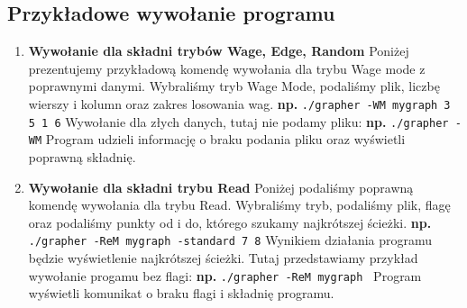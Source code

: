 \documentclass[10pt, a4paper]{report}
\begin{document}
\subsection{Przykładowe wywołanie programu}
\begin{enumerate}
    \item \textbf{Wywołanie dla składni trybów Wage, Edge, Random}
    \newline Poniżej prezentujemy przykładową komendę wywołania dla trybu Wage mode z poprawnymi danymi. Wybraliśmy tryb Wage Mode, podaliśmy plik, liczbę wierszy i kolumn oraz zakres losowania wag.
    \newline\newline \textbf{np.}
    \newline \texttt{./grapher -WM mygraph 3 5 1 6}
    \newline\newline Wywołanie dla złych danych, tutaj nie podamy pliku:
    \newline\newline \textbf{np.}
    \newline \texttt{./grapher -WM}
    \newline\newline Program udzieli informację o braku podania pliku oraz wyświetli poprawną składnię.
    \newpage
    \item \textbf{Wywołanie dla składni trybu Read}
    \newline Poniżej podaliśmy poprawną komendę wywołania dla trybu Read. Wybraliśmy tryb, podaliśmy plik, flagę oraz podaliśmy punkty od i do, którego szukamy najkrótszej ścieżki.
    \newline\newline \textbf{np.}
    \newline \texttt{./grapher -ReM mygraph -standard 7 8}
    \newline\newline Wynikiem działania programu będzie wyświetlenie najkrótszej ścieżki. 
    \newline Tutaj przedstawiamy przykład wywołanie progamu bez flagi:
    \newline\newline \textbf{np.}
    \newline \texttt{./grapher -ReM mygraph }
    \newline\newline Program wyświetli komunikat o braku flagi i składnię programu.
\end{enumerate}
\end{document}
